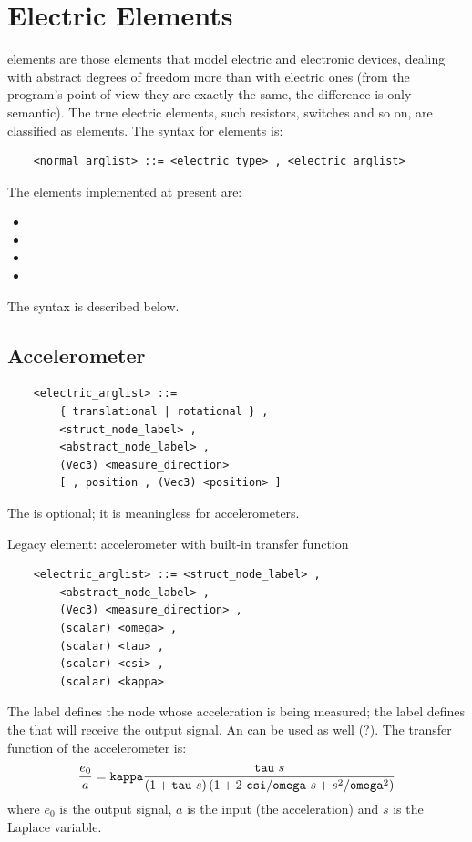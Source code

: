 \section{Electric Elements}
 elements are those elements that model electric and electronic
devices, dealing with abstract degrees of freedom more than with electric
ones (from the program's point of view they are exactly the same, the
difference is only semantic). The true electric elements, such resistors,
switches and so on, are classified as  elements.
The syntax for  elements is:
\begin{verbatim}
    <normal_arglist> ::= <electric_type> , <electric_arglist>
\end{verbatim}
The  elements implemented at present are:
\begin{itemize}
	\item {}
	\item {}
	\item {}
	\item {}
\end{itemize}
The syntax is described below.

\subsection{Accelerometer}
\begin{verbatim}
    <electric_arglist> ::=
        { translational | rotational } ,
        <struct_node_label> ,
        <abstract_node_label> ,
        (Vec3) <measure_direction>
        [ , position , (Vec3) <position> ]
\end{verbatim}
The  is optional; it is meaningless for 
accelerometers.

\noindent
Legacy element: accelerometer with built-in transfer function
\begin{verbatim}
    <electric_arglist> ::= <struct_node_label> ,
        <abstract_node_label> ,
        (Vec3) <measure_direction> ,
        (scalar) <omega> ,
        (scalar) <tau> ,
        (scalar) <csi> ,
        (scalar) <kappa>	
\end{verbatim}
The label  defines the node whose acceleration 
is being measured; the label  defines the
 that will receive the output signal. 
An  can be used as well (?).
The transfer function of the accelerometer is:
\begin{displaymath}
    \frac{e_0}{a} = \texttt{kappa}\frac{\texttt{tau} \ s}{
        \left( 1+\texttt{tau} \ s \right)
        \left( 1+2 \ \texttt{csi}/\texttt{omega} \ s+s^2/\texttt{omega}^2 \right)
    }
\end{displaymath}
where $ e_0 $ is the output signal, $ a $ is the input (the acceleration)
and $ s $ is the Laplace variable.

